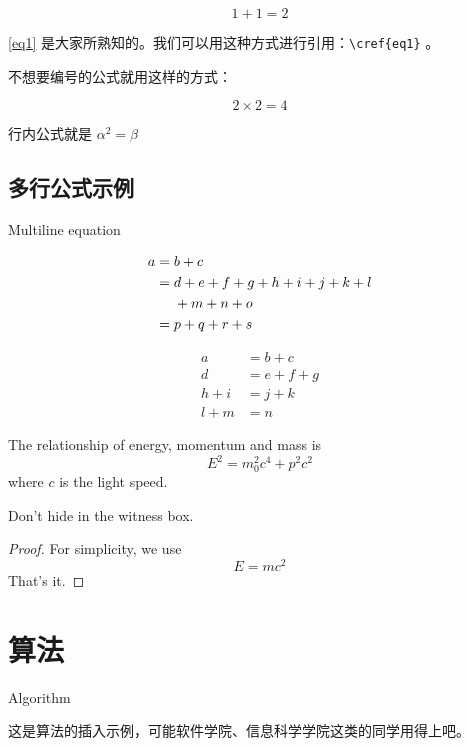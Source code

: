 \begin{equation}
1+1=2 \label{eq1}
\end{equation}

\cref{eq1} 是大家所熟知的。我们可以用这种方式进行引用：\verb|\cref{eq1}| 。

不想要编号的公式就用这样的方式：

 \[ 2\times 2=4 \]

 行内公式就是  $ \alpha ^2= \beta $

\subsection{多行公式示例}{Multiline equation}

\begin{align}
a ={} & b + c \\
={} & d + e + f + g + h + i
+ j + k + l \notag \\
& + m + n + o \\
={} & p + q + r + s
\end{align}

\begin{equation}
\begin{aligned}
a &= b + c \\
d &= e + f + g \\
h + i &= j + k \\
l + m &= n
\end{aligned} \label{eq3}
\end{equation}

\begin{theory}
The relationship of energy,
momentum and mass is
\[E^2 = m_0^2 c^4 + p^2 c^2\]
where $c$ is the light speed.
\end{theory}

\begin{law}\label{law:box}
Don't hide in the witness box.
\end{law}


\begin{proof}
For simplicity, we use
\[
E=mc^2
\]
That's it.
\end{proof}


\section{算法}{Algorithm}

这是算法的插入示例，可能软件学院、信息科学学院这类的同学用得上吧。

